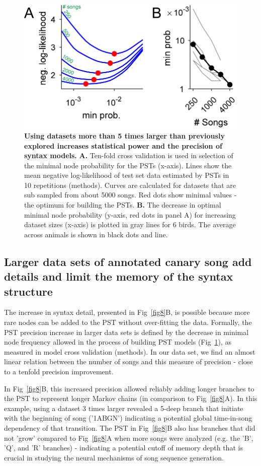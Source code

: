 \documentclass[10pt,letterpaper]{article}
\begin{document}
\begin{figure}[!ht]
\includegraphics[scale=1.0]{Figures/fig10/Figure10_v1.png}
\caption{{\bf Using datasets more than 5 times larger than previously explored increases statistical power and the precision of syntax models.}
\textbf{A.} Ten-fold cross validation is used in selection of the minimal node probability for the PSTs (x-axis). Lines show the mean negative log-likelihood of test set data estimated by PSTs in 10 repetitions (methods). Curves are calculated for datasets that are sub sampled from about 5000 songs. Red dots show minimal values - the optimum for building the PSTs.
\textbf{B.} The decrease in optimal minimal node probability (y-axis, red dots in panel A) for increasing dataset sizes (x-axis) is plotted in gray lines for 6 birds. The average across animals is shown in black dots and line.}
\label{fig10}
\end{figure}

\subsection*{Larger data sets of annotated canary song add details and limit the memory of the syntax structure}
The increase in syntax detail, presented in Fig~\ref{fig8}B, is possible because more rare nodes can be added to the PST without over-fitting the data. Formally, the PST precision increase in larger data sets is defined by the decrease in minimal node frequency allowed in the process of building PST models (Fig~\ref{fig10}), as measured in model cross validation (methods). In our data set, we find an almost linear relation between the number of songs and this measure of precision - close to a tenfold precision improvement.

In Fig~\ref{fig8}B, this increased precision allowed reliably adding longer branches to the PST to represent longer Markov chains (in comparison to Fig~\ref{fig8}A). In this example, using a dataset 3 times larger revealed a 5-deep branch that initiate with the beginning of song ('1ABGN') indicating a potential global time-in-song dependency of that transition. The PST in Fig~\ref{fig8}B also has branches that did not 'grow' compared to Fig~\ref{fig8}A when more songs were analyzed (e.g. the 'B', 'Q', and 'R' branches) - indicating a potential cutoff of memory depth that is crucial in studying the neural mechanisms of song sequence generation. 
\end{document}
